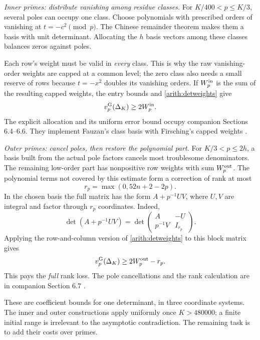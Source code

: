 \emph{Inner primes: distribute vanishing among residue classes.}
For \(K/400<p\le K/3\), several poles can occupy one class.
Choose polynomials with prescribed orders of vanishing at
\(t=-c^2\pmod p\). The Chinese remainder theorem makes them a basis
with unit determinant. Allocating the \(h\) basis vectors among these
classes balances zeros against poles.

Each row's weight must be valid in \emph{every} class. This is why the
raw vanishing-order weights are capped at a common level; the zero
class also needs a small reserve of rows because \(t=-x^2\) doubles
its vanishing orders. If \(W_p^{\rm in}\) is the sum of the resulting
capped weights, the entry bounds and \eqref{arith:detweights} give
\[
 v_p^{\mathrm G}(\Delta_K)\ge2W_p^{\rm in}.
\]
The explicit allocation and its uniform error bound occupy companion
Sections 6.4--6.6. They implement Fauzan's class basis with Firsching's
capped weights \cite[\texttt{InnerWeights.lean},
\texttt{InnerAlloc.lean}]{firsching}.

\emph{Outer primes: cancel poles, then restore the polynomial part.}
For \(K/3<p\le2h\), a basis built from the actual pole factors cancels
most troublesome denominators. The remaining low-order part has
nonpositive row weights with sum \(W_p^{\rm out}\).
The polynomial terms not covered by this estimate form a correction
of rank at most
\[
 r_p=\max(0,52n+2-2p).
\]
In the chosen basis the full matrix has the form \(A+p^{-1}UV\),
where \(U,V\) are integral and factor through \(r_p\) coordinates.
Indeed,
\[
 \det(A+p^{-1}UV)=
 \det\begin{pmatrix}A&-U\\p^{-1}V&I_{r_p}\end{pmatrix}.
\]
Applying the row-and-column version of \eqref{arith:detweights}
to this block matrix gives
\begin{equation}\label{arith:outer}
 v_p^{\mathrm G}(\Delta_K)\ge2W_p^{\rm out}-r_p.
\end{equation}
This pays the \emph{full} rank loss. The pole cancellations and the rank
calculation are in companion Section 6.7
\cite[\texttt{OuterFrame.lean}, \texttt{LowRank.lean}]{firsching}.

These are coefficient bounds for one determinant, in three coordinate
systems. The inner and outer constructions apply uniformly once
\(K>480000\); a finite initial range is irrelevant to the asymptotic
contradiction. The remaining task is to add their costs over primes.
